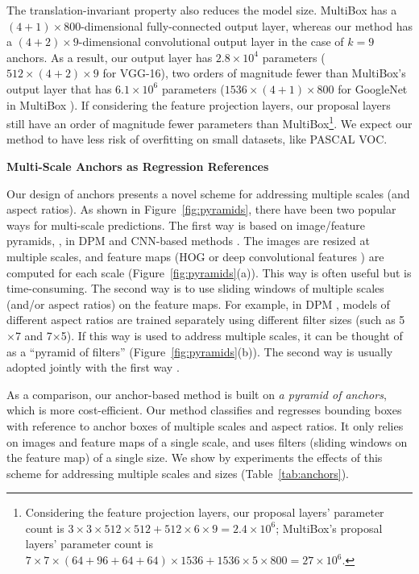 \documentclass[10pt,journal,cspaper,compsoc]{IEEEtran}
\begin{document}
The translation-invariant property also reduces the model size.
MultiBox has a $(4+1)\times800$-dimensional fully-connected output layer, whereas our method has a $(4+2)\times9$-dimensional convolutional output layer in the case of $k=9$ anchors. As a result, our output layer has $2.8\times10^4$ parameters ($512\times(4+2)\times9$ for VGG-16), two orders of magnitude fewer than MultiBox's output layer that has $6.1\times10^6$ parameters ($1536\times(4+1)\times800$ for GoogleNet \cite{Szegedy2015} in MultiBox \cite{Szegedy2014a}).
If considering the feature projection layers, our proposal layers still have an order of magnitude fewer parameters than MultiBox\footnote{Considering the feature projection layers, our proposal layers' parameter count is $3\times3\times512\times512+512\times6\times9=2.4\times10^6$; MultiBox's proposal layers' parameter count is $7\times7\times(64+96+64+64)\times1536+1536\times5\times800=27\times10^6$.}. We expect our method to have less risk of overfitting on small datasets, like PASCAL VOC.


\vspace{.5em}
\noindent\textbf{Multi-Scale Anchors as Regression References}

Our design of anchors presents a novel scheme for addressing multiple scales (and aspect ratios).
As shown in Figure~\ref{fig:pyramids}, there have been two popular ways for multi-scale predictions. The first way is based on image/feature pyramids, \eg, in DPM \cite{Felzenszwalb2010} and CNN-based methods \cite{Sermanet2014,He2014,Girshick2015a}. The images are resized at multiple scales, and feature maps (HOG \cite{Felzenszwalb2010} or deep convolutional features \cite{Sermanet2014,He2014,Girshick2015a}) are computed for each scale (Figure~\ref{fig:pyramids}(a)). This way is often useful but is time-consuming. The second way is to use sliding windows of multiple scales (and/or aspect ratios) on the feature maps. For example, in DPM \cite{Felzenszwalb2010}, models of different aspect ratios are trained separately using different filter sizes (such as 5$\times$7 and 7$\times$5). If this way is used to address multiple scales, it can be thought of as a ``pyramid of filters'' (Figure~\ref{fig:pyramids}(b)). The second way is usually adopted jointly with the first way \cite{Felzenszwalb2010}.

As a comparison, our anchor-based method is built on \emph{a pyramid of anchors}, which is more cost-efficient. Our method classifies and regresses bounding boxes with reference to anchor boxes of multiple scales and aspect ratios.
It only relies on images and feature maps of a single scale, and uses filters (sliding windows on the feature map) of a single size. We show by experiments the effects of this scheme for addressing multiple scales and sizes (Table~\ref{tab:anchors}).
\end{document}
